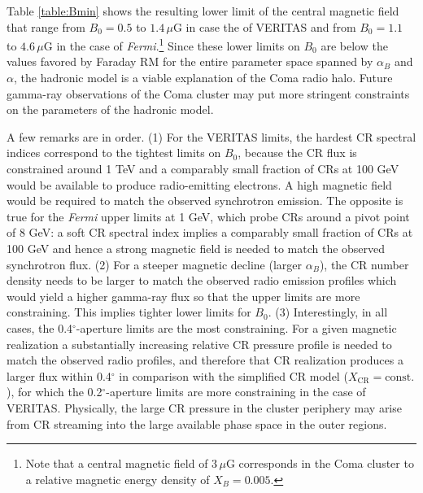 \documentclass[12pt,manuscript]{aastex}
\def\Fermi{{\em Fermi}\xspace}
\newcommand{\rmn}{\mathrm}
\newcommand{\CR}{\mathrm{CR}}
\begin{document}
Table \ref{table:Bmin} shows the resulting lower limit of the central magnetic field that range from
$B_{0} = 0.5$ to $1.4\,\mu$G in case the of VERITAS and from $B_{0} = 1.1$ to $4.6\,\mu$G in the
case of \Fermi.\footnote{Note that a central magnetic field of $3\,\mu$G corresponds in the
Coma cluster to a relative magnetic energy density of $X_B=0.005$.} Since these lower limits on
$B_{0}$ are below the values favored by Faraday RM for the entire parameter space spanned by
$\alpha_{B}$ and $\alpha$, the hadronic model is a viable explanation of the Coma radio halo. Future
gamma-ray observations of the Coma cluster may put more stringent constraints on the parameters of
the hadronic model.

A few remarks are in order. (1) For the VERITAS limits, the hardest
CR spectral indices correspond to the tightest limits on $B_{0}$, because the CR flux is constrained
around 1 TeV and a comparably small fraction of CRs at 100 GeV would be available to produce
radio-emitting electrons. A high magnetic field would be required to match the observed
synchrotron emission. The opposite is true for the \Fermi upper limits at 1 GeV, which
probe CRs around a pivot point of 8 GeV: a soft CR spectral index implies a comparably small
fraction of CRs at 100 GeV and hence a strong magnetic field is needed to match the observed
synchrotron flux. (2) For a steeper
magnetic decline (larger $\alpha_{B}$), the CR number density needs to be larger to match the
observed radio emission profiles which would yield a higher gamma-ray flux so that the upper limits
are more constraining. This implies tighter lower limits for $B_{0}$. (3) Interestingly, in all
cases, the 0.4$^{\circ}$-aperture limits are the most constraining. For a given magnetic
realization a substantially increasing relative CR pressure profile is needed to match the
observed radio profiles, and therefore that CR realization produces a larger flux within 
0.4$^{\circ}$ in comparison with the simplified CR model ($X_{\CR} = \rmn{const.}$), for which the
0.2$^{\circ}$-aperture limits are more constraining in the case of VERITAS. Physically, the large
CR pressure in the cluster periphery may arise from CR streaming into the large available phase
space in the outer regions.
\end{document}
